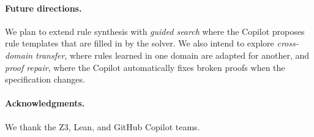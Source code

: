 \documentclass[11pt]{article}
\begin{document}
\paragraph{Future directions.}
We plan to extend rule synthesis with \emph{guided search} where the Copilot
proposes rule templates that are filled in by the solver.  We also intend to
explore \emph{cross-domain transfer}, where rules learned in one domain are
adapted for another, and \emph{proof repair}, where the Copilot automatically
fixes broken proofs when the specification changes.

\paragraph{Acknowledgments.}
We thank the Z3, Lean, and GitHub Copilot teams.
\end{document}
